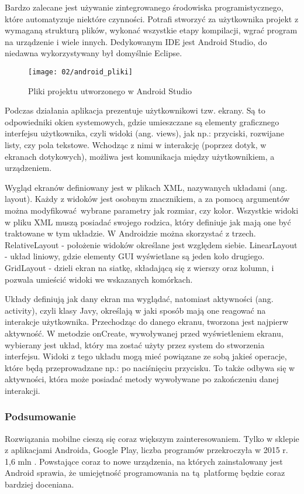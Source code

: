 Bardzo zalecane jest używanie zintegrowanego środowiska programistycznego, które automatyzuje niektóre czynności. Potrafi stworzyć za użytkownika projekt z wymaganą strukturą plików, wykonać wszystkie etapy kompilacji, wgrać program na urządzenie i wiele innych. Dedykowanym IDE jest Android Studio, do niedawna wykorzystywany był domyślnie Eclipse.

\begin{figure}[h]
	\begin{center}
		\texttt{[image: 02/android\_pliki]}
	\end{center}
	\caption{Pliki projektu utworzonego w Android Studio}
	\vspace{-0.3cm}
\end{figure}

Podczas działania aplikacja prezentuje użytkownikowi tzw. ekrany. Są to odpowiedniki okien systemowych, gdzie umieszczane są elementy graficznego interfejsu użytkownika, czyli widoki (ang. views), jak np.: przyciski, rozwijane listy, czy pola tekstowe. Wchodząc z nimi w interakcję (poprzez dotyk, w ekranach dotykowych), możliwa jest komunikacja między użytkownikiem, a urządzeniem. 

Wygląd ekranów definiowany jest w plikach XML, nazywanych układami (ang. layout). Każdy z widoków jest osobnym znacznikiem, a za pomocą argumentów można modyfikować wybrane parametry jak rozmiar, czy kolor. Wszystkie widoki w pliku XML muszą posiadać swojego rodzica, który definiuje jak mają one być traktowane w tym układzie. W Androidzie można skorzystać z trzech. RelativeLayout - położenie widoków określane jest względem siebie. LinearLayout - układ liniowy, gdzie elementy GUI wyświetlane są jeden koło drugiego. GridLayout - dzieli ekran na siatkę, składającą się z wierszy oraz kolumn, i pozwala umieścić widoki we wskazanych komórkach.

Układy definiują jak dany ekran ma wyglądać, natomiast aktywności (ang. activity), czyli klasy Javy, określają w jaki sposób mają one reagować na interakcje użytkownika. Przechodząc do danego ekranu, tworzona jest najpierw aktywność. W metodzie onCreate, wywoływanej przed wyświetleniem ekranu, wybierany jest układ, który ma zostać użyty przez system do stworzenia interfejsu. Widoki z tego układu mogą mieć powiązane ze sobą jakieś operacje, które będą przeprowadzane np.: po naciśnięciu przycisku. To także odbywa się w aktywności, która może posiadać metody wywoływane po zakończeniu danej interakcji.

\subsubsection*{Podsumowanie}
Rozwiązania mobilne cieszą się coraz większym zainteresowaniem. Tylko w sklepie z aplikacjami Androida, Google Play, liczba programów przekroczyła w 2015 r. 1,6 mln \cite{biblia_ebiznesu_2}. Powstające coraz to nowe urządzenia, na których zainstalowany jest Android sprawia, że umiejętność programowania na tą platformę będzie coraz bardziej doceniana.


